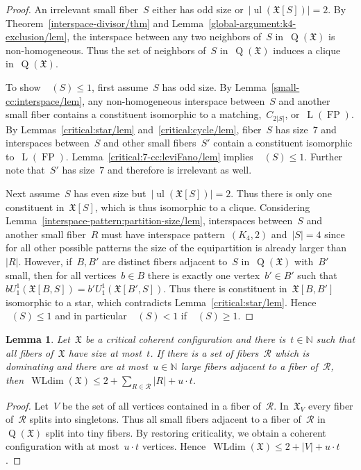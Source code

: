 \documentclass[english,a4paper]{article}
\theoremstyle{plain}
\newtheorem{lemma}      [theorem]{Lemma}
\theoremstyle{definition}
\newcommand{\Nat}{\ensuremath{\mathbb{N}}}
\newcommand{\abs}[1]{| #1 |}
\newcommand{\coherentConfig}{\ensuremath{\mathfrak{X}}}
\newcommand{\interspace}[2]{\ensuremath{\coherentConfig[#1,#2]}}
\newcommand{\inducedCC}[1]{\ensuremath{\coherentConfig[#1]}}
\DeclareMathOperator*{\ul}{ul}
\DeclareMathOperator*{\WLdim}{WLdim}
\newcommand{\wldim}[1]{\ensuremath{\WLdim\left(#1\right)}}
\DeclareMathOperator*{\Quotient}{Q}
\newcommand{\quotientGraph}[1]{\ensuremath{\Quotient(#1)}}
\DeclareMathOperator{\ColorDegLarge}{cdeg_L}
\DeclareMathOperator{\ColorDegSmall}{cdeg_S}
\newcommand{\colorDegLarge}[1]{\ensuremath{\ColorDegLarge\left(#1\right)}}
\newcommand{\colorDegSmall}[1]{\ensuremath{\ColorDegSmall\left(#1\right)}}
\newcommand{\ipfourClique}  {\ensuremath{(\clique{4},2)}}
\newcommand{\clique}[1]{\ensuremath{K_{#1}}}
\newcommand{\cycle}[1]{\ensuremath{C_{#1}}}
\DeclareMathOperator{\fanoPlane}{FP}
\DeclareMathOperator{\LeviGraph}{L}
\newcommand{\leviGraph}[1]{\ensuremath{\LeviGraph\!\left(#1\right)}}
\newcommand{\leviFano}{\leviGraph{\fanoPlane}}
\begin{document}
\begin{proof}
    An irrelevant small fiber~$S$ either has odd size or~$|\ul(\inducedCC{S})| = 2$.
    By Theorem~\ref{interspace-divisor/thm} and Lemma~\ref{global-argument:k4-exclusion/lem}, the interspace between any two neighbors of~$S$ in~$\quotientGraph{\coherentConfig}$ is non-homogeneous.
    Thus the set of neighbors of~$S$ in~$\quotientGraph{\coherentConfig}$ induces a clique in~$\quotientGraph{\coherentConfig}$.

    To show~$\colorDegSmall{S} \leq 1$, first assume~$S$ has odd size.
    By Lemma~\ref{small-cc:interspace/lem}, any non-homogeneous interspace between~$S$ and another small fiber contains a constituent isomorphic to a matching,~$\cycle{2|S|}$, or~$\leviFano$.
    By Lemmas~\ref{critical:star/lem} and~\ref{critical:cycle/lem}, fiber~$S$ has size~$7$ and interspaces between~$S$ and other small fibers~$S'$ contain a constituent isomorphic to~$\leviFano$.
    Lemma~\ref{critical:7-cc:leviFano/lem} implies~$\colorDegSmall{S} \leq 1$.
    Further note that~$S'$ has size~$7$ and therefore is irrelevant as well.

    Next assume~$S$ has even size but~$|\ul(\inducedCC{S})| = 2$.
    Thus there is only one constituent in~$\inducedCC{S}$, which is thus isomorphic to a clique.
    Considering Lemma~\ref{interspace-pattern:partition-size/lem}, interspaces between~$S$ and another small fiber~$R$ must have interspace pattern~$\ipfourClique$ and~$|S| = 4$ since for all other possible patterns the size of the equipartition is already larger than~$|R|$.
    However, if~$B,B'$ are distinct fibers adjacent to~$S$ in~$\quotientGraph{\coherentConfig}$ with~$B'$ small, then for all vertices~$b \in B$ there is exactly one vertex~$b' \in B'$ such that~$b U^1_1(\interspace{B}{S}) = b' U^1_1(\interspace{B'}{S})$.
    Thus there is constituent in~$\interspace{B}{B'}$ isomorphic to a star, which contradicts Lemma~\ref{critical:star/lem}.
    Hence~$\colorDegSmall{S} \leq 1$ and in particular~$\colorDegSmall{S} < 1$ if~$\colorDegLarge{S} \geq 1$.
\end{proof}


\begin{lemma}
\label{dominating:wldim/lem}
    Let~$\coherentConfig$ be a critical coherent configuration and there is~$t \in \Nat$ such that all fibers of~$\coherentConfig$ have size at most~$t$.
    If there is a set of fibers~$\mathcal{R}$ which is dominating and there are at most~$u \in \Nat$ large fibers adjacent to a fiber of~$\mathcal{R}$, then~$\wldim{\coherentConfig} \leq 2 + \sum_{R \in \mathcal{R}} |R| + u \cdot t$.
\end{lemma}
\begin{proof}
    Let~$V$ be the set of all vertices contained in a fiber of~$\mathcal{R}$.
    In~$\coherentConfig_{V}$ every fiber of~$\mathcal{R}$ splits into singletons.
    Thus all small fibers adjacent to a fiber of~$\mathcal{R}$ in~$\quotientGraph{\coherentConfig}$ split into tiny fibers.
    By restoring criticality, we obtain a coherent configuration with at most~$u \cdot t$ vertices.
    Hence~$\wldim{\coherentConfig} \leq 2 + \abs{V} + u \cdot t$.
\end{proof}
\end{document}
